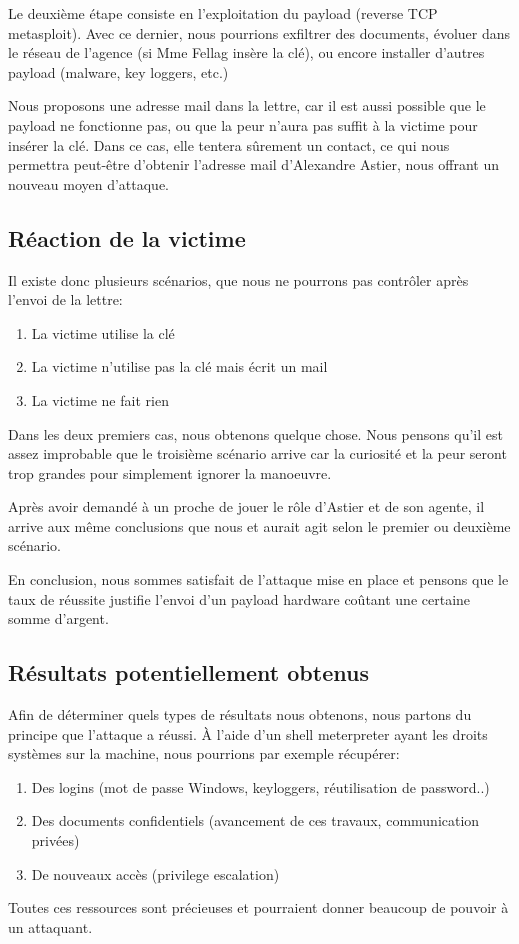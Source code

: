 Le deuxième étape consiste en l'exploitation du payload (reverse TCP metasploit).
Avec ce dernier, nous pourrions exfiltrer des documents, évoluer dans le réseau de l'agence (si Mme Fellag insère la clé), ou encore installer d'autres
payload (malware, key loggers, etc.)

Nous proposons une adresse mail dans la lettre, car il est aussi possible que le payload ne fonctionne
pas, ou que la peur n'aura pas suffit à la victime pour insérer la clé. Dans ce cas, elle tentera sûrement un contact, ce qui nous permettra peut-être d'obtenir
l'adresse mail d'Alexandre Astier, nous offrant un nouveau moyen d'attaque. 
\subsection{Réaction de la victime}

Il existe donc plusieurs scénarios, que nous ne pourrons pas contrôler après l'envoi de la lettre:
\begin{enumerate}
    \item La victime utilise la clé
    \item La victime n'utilise pas la clé mais écrit un mail
    \item La victime ne fait rien
\end{enumerate}
Dans les deux premiers cas, nous obtenons quelque chose. Nous pensons qu'il est assez improbable que le troisième scénario arrive car la curiosité et la peur seront trop grandes pour
simplement ignorer la manoeuvre.

Après avoir demandé à un proche de jouer le rôle d'Astier et de son agente, il arrive aux même conclusions que nous et aurait agit
selon le premier ou deuxième scénario.

En conclusion, nous sommes satisfait de l'attaque mise en place et pensons que le taux de réussite justifie l'envoi d'un payload hardware coûtant une certaine somme d'argent.
\subsection{Résultats potentiellement obtenus}

Afin de déterminer quels types de résultats nous obtenons, nous partons du principe que l'attaque a réussi.
À l'aide d'un shell meterpreter ayant les droits systèmes sur la machine, nous pourrions par exemple récupérer:
\begin{enumerate}
    \item Des logins (mot de passe Windows, keyloggers, réutilisation de password..)
    \item Des documents confidentiels (avancement de ces travaux, communication privées)
    \item De nouveaux accès (privilege escalation)
\end{enumerate}
Toutes ces ressources sont précieuses et pourraient donner beaucoup de pouvoir à un attaquant. 